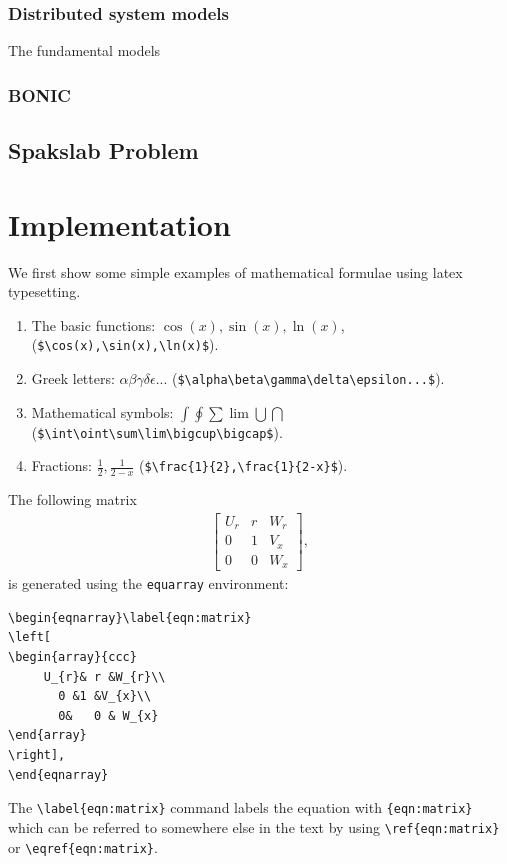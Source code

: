 \documentclass[11pt]{book}
\begin{document}
\subsection{Distributed system models}
The fundamental models 
\subsection{BONIC}
\section{Spakslab Problem}

\chapter{Implementation}
We first show  some simple examples of 
mathematical formulae using latex typesetting.

\begin{enumerate}
\item The basic functions: $\cos(x),  \sin(x),   \ln(x) $,  (\verb+$\cos(x),\sin(x),\ln(x)$+). 
\item Greek letters: $\alpha \beta \gamma \delta\epsilon...$ (\verb+$\alpha\beta\gamma\delta\epsilon...$+).
\item Mathematical symbols: $\int  \oint \sum\lim\bigcup \bigcap$
 (\verb+$\int\oint\sum\lim\bigcup\bigcap$+).
\item Fractions: $\frac{1}{2},\frac{1}{2-x}$ (\verb+$\frac{1}{2},\frac{1}{2-x}$+).
\end{enumerate}

The following matrix 
\begin{eqnarray}\label{eqn:matrix}
\left[
\begin{array}{ccc}
	 U_{r}&     r       &   W_{r}	\\
	   0       &	1      &  V_{x}	\\
	   0	   &	0      &  W_{x}
\end{array}
\right], 
\end{eqnarray}
is generated using  the \verb+equarray+ environment:
\begin{verbatim}
\begin{eqnarray}\label{eqn:matrix}
\left[
\begin{array}{ccc}
	 U_{r}& r &W_{r}\\
	   0 &1 &V_{x}\\
	   0&	0 & W_{x}
\end{array}
\right], 
\end{eqnarray}
\end{verbatim}
The \verb+\label{eqn:matrix}+ command labels the equation with \verb+{eqn:matrix}+ which can 
be referred  to somewhere else in the text by using \verb+\ref{eqn:matrix}+ or  \verb+\eqref{eqn:matrix}+.
\end{document}
